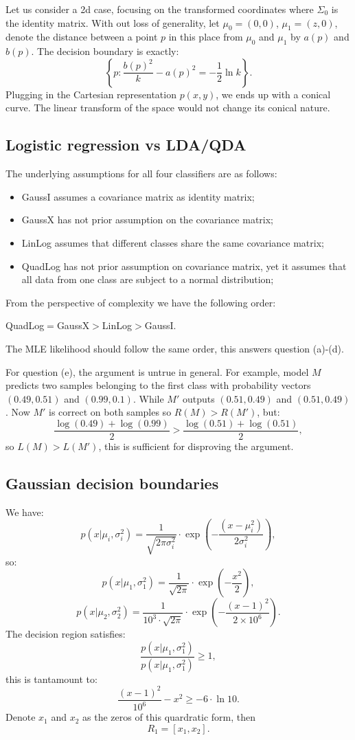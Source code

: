 \documentclass[UTF8]{ctexart}
\begin{document}
Let us consider a 2d case, focusing on the transformed coordinates where $\Sigma_{0}$ is the identity matrix.
With out loss of generality, let $\mu_{0}=(0,0)$, $\mu_{1}=(z,0)$, denote the distance between a point $p$ in this place from $\mu_{0}$ and $\mu_{1}$ by $a(p)$ and $b(p)$.
The decision boundary is exactly:
$$\left\{p:\frac{b(p)^{2}}{k}-a(p)^{2}=-\frac{1}{2}\ln k \right\}.$$
Plugging in the Cartesian representation $p(x,y)$, we ends up with a conical curve.
The linear transform of the space would not change its conical nature.

\subsection{Logistic regression vs LDA/QDA}
The underlying assumptions for all four classifiers are as follows:
\begin{itemize}
\item GaussI assumes a covariance matrix as identity matrix;
\item GaussX has not prior assumption on the covariance matrix;
\item LinLog assumes that different classes share the same covariance matrix;
\item QuadLog has not prior assumption on covariance matrix, yet it assumes that all data from one class are subject to a normal distribution;
\end{itemize}
From the perspective of complexity we have the following order:

QuadLog$=$GaussX$>$LinLog$>$GaussI.

The MLE likelihood should follow the same order, this answers question (a)-(d).

For question (e), the argument is untrue in general.
For example, model $M$ predicts two samples belonging to the first class with probability vectors $(0.49,0.51)$ and $(0.99,0.1)$.
While $M'$ outputs $(0.51,0.49)$ and $(0.51,0.49)$.
Now $M'$ is correct on both samples so $R(M)>R(M')$, but:
$$\frac{\log (0.49)+\log (0.99)}{2} > \frac{\log (0.51)+\log (0.51)}{2},$$
so $L(M)>L(M')$, this is sufficient for disproving the argument.

\subsection{Gaussian decision boundaries}
We have:
$$p(x|\mu_{i},\sigma^{2}_{i})=\frac{1}{\sqrt{2\pi\sigma^{2}_{i}}}\cdot\exp\left( -\frac{(x-\mu_{i}^{2})}{2\sigma^{2}_{i}}\right),$$
so:
$$p(x|\mu_{1},\sigma^{2}_{1})=\frac{1}{\sqrt{2\pi}}\cdot\exp\left(-\frac{x^{2}}{2} \right),$$
$$p(x|\mu_{2},\sigma^{2}_{2})=\frac{1}{10^{3}\cdot\sqrt{2\pi}}\cdot\exp\left(-\frac{(x-1)^{2}}{2\times 10^{6}} \right).$$
The decision region satisfies:
$$\frac{p(x|\mu_{1},\sigma^{2}_{1})}{p(x|\mu_{1},\sigma^{2}_{1})}\geq 1,$$
this is tantamount to:
$$\frac{(x-1)^{2}}{10^{6}}-x^{2}\geq -6\cdot \ln 10.$$
Denote $x_{1}$ and $x_{2}$ as the zeros of this quardratic form, then
$$R_{1}=[x_{1},x_{2}].$$
\end{document}
